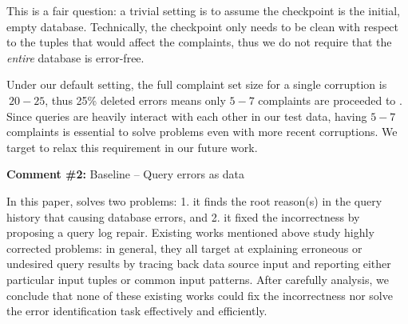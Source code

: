 \begin{quote}
\end{quote}
This is a fair question: a trivial setting is to assume the checkpoint is the initial, empty database.
Technically, the checkpoint only needs to be clean with respect to the tuples that would affect the complaints, thus we do not require that the {\it entire} database is error-free.  

\begin{quote}
\end{quote}

Under our default setting, the full complaint set size for a single corruption is $~20-25$, thus 
25\% deleted errors means only $5-7$ complaints are proceeded to \sys. Since queries
are heavily interact with each other in our test data, having $5-7$ complaints is essential 
to solve problems even with more recent corruptions. 
We target to relax this requirement in our future work.



\comskip

\noindent
\textbf{Comment \#2:} Baseline -- Query errors as data
\begin{quote}
\end{quote}


In this paper, \sys solves two problems: 1. it finds the root reason(s) in the
query history that causing database errors, and 2. it fixed the incorrectness
by proposing a query log repair. Existing works mentioned above study highly
corrected problems: in general, they all target at explaining erroneous or
undesired query results by tracing back data source input and reporting either
particular input tuples or common input patterns. After carefully analysis, we
conclude that none of these existing works could fix the incorrectness nor
solve the error identification task effectively and efficiently.

